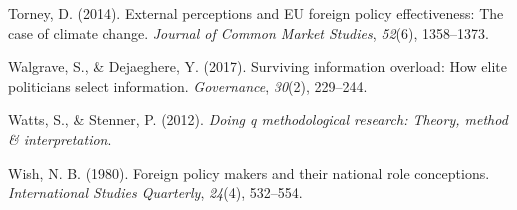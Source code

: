 \documentclass[
  letterpaper,
  DIV=11,
  numbers=noendperiod]{scrartcl}
\newlength{\cslhangindent}
\newenvironment{CSLReferences}[2] %
 {\begin{list}{}{%
  \setlength{\itemindent}{0pt}
  \setlength{\leftmargin}{0pt}
  \setlength{\parsep}{0pt}
  \ifodd #1
   \setlength{\leftmargin}{\cslhangindent}
   \setlength{\itemindent}{-1\cslhangindent}
  \fi
  \setlength{\itemsep}{#2\baselineskip}}}
 {\end{list}}
\begin{document}
\begin{CSLReferences}{1}{0}
Torney, D. (2014). External perceptions and EU foreign policy
effectiveness: The case of climate change. \emph{Journal of Common
Market Studies}, \emph{52}(6), 1358--1373.

Walgrave, S., \& Dejaeghere, Y. (2017). Surviving information overload:
How elite politicians select information. \emph{Governance},
\emph{30}(2), 229--244.

Watts, S., \& Stenner, P. (2012). \emph{Doing q methodological research:
Theory, method \& interpretation}.

Wish, N. B. (1980). Foreign policy makers and their national role
conceptions. \emph{International Studies Quarterly}, \emph{24}(4),
532--554.

\end{CSLReferences}
\end{document}
